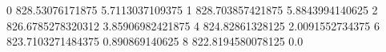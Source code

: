 0 828.53076171875 5.7113037109375
1 828.703857421875 5.8843994140625
2 826.6785278320312 3.85906982421875
4 824.82861328125 2.0091552734375
6 823.7103271484375 0.890869140625
8 822.8194580078125 0.0
